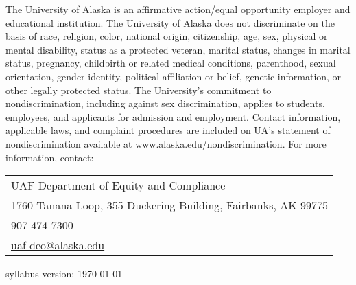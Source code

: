 \documentclass[12pt]{article}
\def\mailto#1{\href{mailto:#1}{#1}}
\begin{document}
The University of Alaska is an affirmative action/equal opportunity employer and educational institution. The University of Alaska does not discriminate on the basis of race, religion, color, national origin, citizenship, age, sex, physical or mental disability, status as a protected veteran, marital status, changes in marital status, pregnancy, childbirth or related medical conditions, parenthood, sexual orientation, gender identity, political affiliation or belief, genetic information, or other legally protected status. The University's commitment to nondiscrimination, including against sex discrimination, applies to students, employees, and applicants for admission and employment. Contact information, applicable laws, and complaint procedures are included on UA's statement of nondiscrimination available at www.alaska.edu/nondiscrimination. For more information, contact:

\begin{tabular}{l}
UAF Department of Equity and Compliance\\
1760 Tanana Loop, 355 Duckering Building, Fairbanks, AK  99775\\
907-474-7300\\
\mailto{uaf-deo@alaska.edu}
\end{tabular}

\vfill

\quad \hfill \scriptsize syllabus version: \today \normalsize
\end{document}
